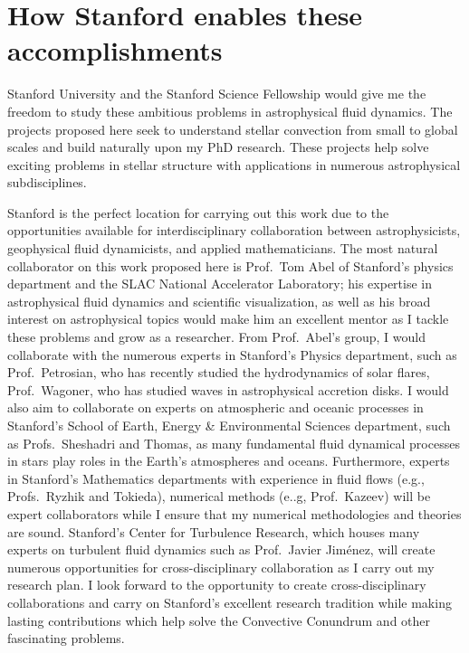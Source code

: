 \documentclass[aps, pre, onecolumn, nofootinbib, notitlepage, groupedaddress, amsfonts, amssymb, amsmath]{revtex4-1}
\begin{document}
\vspace{-10pt}
\section*{How Stanford enables these accomplishments}
\vspace{-8pt}
Stanford University and the Stanford Science Fellowship would give me the freedom to study these ambitious problems in astrophysical fluid dynamics.
The projects proposed here seek to understand stellar convection from small to global scales and build naturally upon my PhD research.
These projects help solve exciting problems in stellar structure with applications in numerous astrophysical subdisciplines.

Stanford is the perfect location for carrying out this work due to the opportunities available for interdisciplinary collaboration between astrophysicists, geophysical fluid dynamicists, and applied mathematicians.
The most natural collaborator on this work proposed here is Prof.~Tom Abel of Stanford's physics department and the SLAC National Accelerator Laboratory; his expertise in astrophysical fluid dynamics and scientific visualization, as well as his broad interest on astrophysical topics would make him an excellent mentor as I tackle these problems and grow as a researcher.
From Prof.~Abel's group, I would collaborate with the numerous experts in Stanford's Physics department, such as Prof.~Petrosian, who has recently studied the hydrodynamics of solar flares, Prof.~Wagoner, who has studied waves in astrophysical accretion disks.
I would also aim to collaborate on experts on atmospheric and oceanic processes in Stanford's School of Earth, Energy \& Environmental Sciences department, such as Profs.~Sheshadri and Thomas, as many fundamental fluid dynamical processes in stars play roles in the Earth's atmospheres and oceans.
Furthermore, experts in Stanford's Mathematics departments with experience in fluid flows (e.g., Profs.~Ryzhik and Tokieda), numerical methods (e..g, Prof.~Kazeev) will be expert collaborators while I ensure that my numerical methodologies and theories are sound.
Stanford's Center for Turbulence Research, which houses many experts on turbulent fluid dynamics such as Prof.~Javier Jim\'{e}nez, will create numerous opportunities for cross-disciplinary collaboration as I carry out my research plan.
I look forward to the opportunity to create cross-disciplinary collaborations and carry on Stanford's excellent research tradition while making lasting contributions which help solve the Convective Conundrum and other fascinating problems. 



\end{document}
